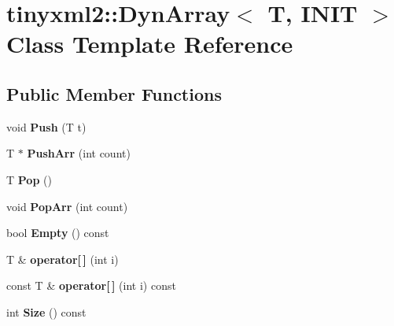 \hypertarget{classtinyxml2_1_1DynArray}{}\section{tinyxml2\+:\+:Dyn\+Array$<$ T, I\+N\+IT $>$ Class Template Reference}
\label{classtinyxml2_1_1DynArray}
\subsection*{Public Member Functions}
\begin{DoxyCompactItemize}
\item 
\mbox{\label{classtinyxml2_1_1DynArray_a498de53808ba0151fef54ea10bf51050}} 
void {\bfseries Push} (T t)
\item 
\mbox{\label{classtinyxml2_1_1DynArray_aa3c360d40addc3b05121da9f60a01b4d}} 
T $\ast$ {\bfseries Push\+Arr} (int count)
\item 
\mbox{\label{classtinyxml2_1_1DynArray_a2281e3342bc235bf391a67e362c75866}} 
T {\bfseries Pop} ()
\item 
\mbox{\label{classtinyxml2_1_1DynArray_ab45c0836d8c0260a5b9eda7da80de71c}} 
void {\bfseries Pop\+Arr} (int count)
\item 
\mbox{\label{classtinyxml2_1_1DynArray_af1d33687d0a0121dc184d5939e3f6ea1}} 
bool {\bfseries Empty} () const
\item 
\mbox{\label{classtinyxml2_1_1DynArray_a775a6ab4d41f0eb15bdd863d408dd58f}} 
T \& {\bfseries operator\mbox{[}$\,$\mbox{]}} (int i)
\item 
\mbox{\label{classtinyxml2_1_1DynArray_a18435e1e2112f80a3ee102f048d04273}} 
const T \& {\bfseries operator\mbox{[}$\,$\mbox{]}} (int i) const
\item 
\mbox{\label{classtinyxml2_1_1DynArray_a6183def8d07b0d30d3399ede701952d9}} 
int {\bfseries Size} () const
\item 

\end{DoxyCompactItemize}
